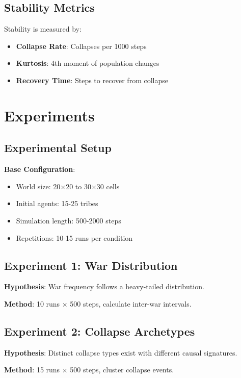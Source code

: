 \documentclass[11pt,a4paper]{article}
\begin{document}
\subsection{Stability Metrics}

Stability is measured by:
\begin{itemize}
    \item \textbf{Collapse Rate}: Collapses per 1000 steps
    \item \textbf{Kurtosis}: 4th moment of population changes
    \item \textbf{Recovery Time}: Steps to recover from collapse
\end{itemize}

\section{Experiments}

\subsection{Experimental Setup}

\textbf{Base Configuration}:
\begin{itemize}
    \item World size: 20$\times$20 to 30$\times$30 cells
    \item Initial agents: 15-25 tribes
    \item Simulation length: 500-2000 steps
    \item Repetitions: 10-15 runs per condition
\end{itemize}

\subsection{Experiment 1: War Distribution}

\textbf{Hypothesis}: War frequency follows a heavy-tailed distribution.

\textbf{Method}: 10 runs $\times$ 500 steps, calculate inter-war intervals.

\subsection{Experiment 2: Collapse Archetypes}

\textbf{Hypothesis}: Distinct collapse types exist with different causal signatures.

\textbf{Method}: 15 runs $\times$ 500 steps, cluster collapse events.
\end{document}
